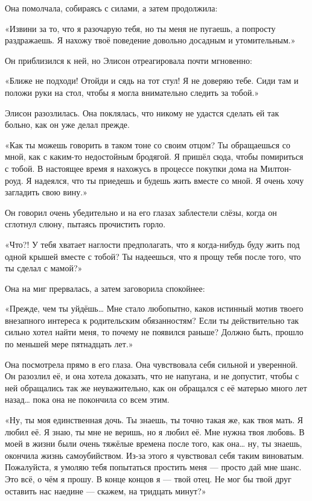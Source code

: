 \documentclass[a5paper, 9pt,
final, openany, twoside=true]{memoir}
\begin{document}
Она помолчала, собираясь с силами, а затем продолжила:

«Извини за то, что я разочарую тебя, но ты меня не пугаешь, а попросту раздражаешь. Я нахожу твоё поведение довольно досадным и утомительным.»

Он приблизился к ней, но Элисон отреагировала почти мгновенно:

«Ближе не подходи! Отойди и сядь на тот стул! Я не доверяю тебе. Сиди там и положи руки на стол, чтобы я могла внимательно следить за тобой.»

Элисон разозлилась. Она поклялась, что никому не удастся сделать ей так больно, как он уже делал прежде.

«Как ты можешь говорить в таком тоне со своим отцом? Ты обращаешься со мной, как с каким-то недостойным бродягой. Я пришёл сюда, чтобы помириться с тобой. В настоящее время я нахожусь в процессе покупки дома на Милтон-роуд. Я надеялся, что ты приедешь и будешь жить вместе со мной. Я очень хочу загладить свою вину.»

Он говорил очень убедительно и на его глазах заблестели слёзы, когда он сглотнул слюну, пытаясь прочистить горло.

«Что?! У тебя хватает наглости предполагать, что я когда-нибудь буду жить под одной крышей вместе с тобой? Ты надеешься, что я прощу тебя после того, что ты сделал с мамой?»

Она на миг прервалась, а затем заговорила спокойнее:

«Прежде, чем ты уйдёшь… Мне стало любопытно, каков истинный мотив твоего внезапного интереса к родительским обязанностям? Если ты действительно так сильно хотел найти меня, то почему не появился раньше? Должно быть, прошло по меньшей мере пятнадцать лет.»

Она посмотрела прямо в его глаза. Она чувствовала себя сильной и уверенной. Он разозлил её, и она хотела доказать, что не напугана, и не допустит, чтобы с ней обращались так же неуважительно, как он обращался с её матерью много лет назад… пока она не покончила со всем этим.

«Ну, ты моя единственная дочь. Ты знаешь, ты точно такая же, как твоя мать. Я любил её. Я знаю, ты мне не веришь, но я любил её. Мне нужна твоя любовь. В моей в жизни были очень  тяжёлые времена после того, как она… ну, ты знаешь, окончила жизнь самоубийством. Из-за этого я чувствовал себя таким виноватым. Пожалуйста, я умоляю тебя попытаться простить меня — просто дай мне шанс. Это всё, о чём я прошу. В конце концов я — твой отец. Не мог бы твой друг оставить нас наедине — скажем, на тридцать минут?»
\end{document}
